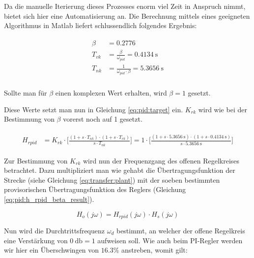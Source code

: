 Da die manuelle Iterierung dieses Prozesses enorm viel Zeit in Anspruch nimmt,
bietet  sich  hier  eine  Automatisierung  an. Die  Berechnung  mittels  eines
geeigneten Algorithmus in Matlab liefert schlussendlich folgendes Ergebnis:

\begin{gather} \label{eq:pid:beta_result}
    \begin{split}
        \beta    & = 0.2776 \\
        {T_{vk}} & = \frac{\beta}{\omega_{pid}}           = \SI{0.4134}{\second} \\
        {T_{nk}} & = \frac{1}{\omega_{pid} \cdot \beta}   = \SI{5.3656}{\second} \\
    \end{split}
\end{gather}

Sollte  man  f\"ur  $\beta$  einen komplexen  Wert  erhalten,  wird  $\beta=1$
gesetzt.

Diese  Werte setzt man nun in Gleichung \ref{eq:pid:target} ein. $K_{rk}$ wird
wie bei der Bestimmung von $\beta$ vorerst noch auf 1 gesetzt.

\begin{gather} \label{eq:pid:h_rpid_beta_result}
    \begin{split}
        H_{rpid} & = K_{rk} \cdot \biggl[ \frac{(1 + s \cdot T_{nk}               ) \cdot (1 + s \cdot T_{vk}               ) }{ s \cdot T_{nk}               } \biggr]
                   = 1      \cdot \biggl[ \frac{(1 + s \cdot \SI{5.3656}{\second} ) \cdot (1 + s \cdot \SI{0.4134}{\second} ) }{ s \cdot \SI{5.3656}{\second} } \biggr]
    \end{split}
\end{gather}

Zur Bestimmung von $K_{rk}$ wird nun der Frequenzgang des offenen Regelkreises
betrachtet. Dazu  multipliziert  man  wie  gehabt  die  \"Ubertragungsfunktion
der  Strecke   (siehe  Gleichung   \ref{eq:transfer:plant})  mit   der  soeben
bestimmten  provisorischen   \"Ubertragungsfunktion  des   Reglers  (Gleichung
\ref{eq:pid:h_rpid_beta_result}).

\begin{equation} \label{eq:pid:h_o_k_rk_one}
    H_{o}(j\omega) = H_{rpid}(j\omega) \cdot H_s(j\omega)
\end{equation}

Nun wird  die Durchtrittsfrequenz $\omega_d$  bestimmt, an welcher  der offene
Regelkreis eine  Verst\"arkung von $\SI{0}{\decibel} =  1$ aufweisen soll. Wie
auch  beim  PI-Regler  werden  wir   hier  ein  \"Uberschwingen  von  $16.3\%$
anstreben, womit gilt:

